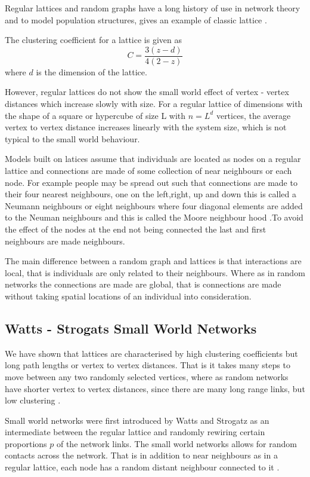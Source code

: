 Regular lattices and random graphs have a long history of use in network theory and to model population structures,  gives an example of classic lattice \citep{harris1974contact}.

The clustering coefficient for a lattice is given as  
\begin{equation}
C = \frac{3(z -d)}{4(2-z)}
\end{equation}
where $d$ is the dimension of the lattice.

However, regular lattices do not show the small world effect of vertex - vertex distances which increase slowly with size. For a regular lattice of dimensions with the shape of a square or hypercube of size L with $n = L^d$ vertices, the average vertex to vertex distance increases linearly with the system size, which is not typical to the small world behaviour. 


 Models built on latices assume that individuals are located as nodes on a regular lattice and connections are made of some collection of near neighbours or each node. For example people may be spread out such that connections are made to their four nearest neighbours, one on the left,right, up and down this is called a Neumann neighbours  or eight neighbours where four diagonal elements are added to the Neuman neighbours and this is called the Moore neighbour hood \citep{lloyd2006infection}.To avoid the effect of the nodes at the end not being connected the last and first neighbours are made neighbours.

The main difference between a random graph and lattices is that interactions are local, that is individuals are only related to their neighbours. Where as in random networks the connections are made are global, that is connections are made without taking spatial locations of an individual into consideration. 

\subsection{Watts - Strogats Small World Networks}
We have shown that lattices are characterised by high clustering coefficients but long path lengths or vertex to vertex distances. That is it takes many steps to move between any two randomly selected vertices, where as random networks have shorter vertex to vertex distances, since there are many long range links, but low clustering \citep{keeling2005networks}.


Small world networks  were first introduced by Watts and Strogatz as an intermediate between the regular lattice and randomly rewiring certain proportions $p$ of the network links\citep{watts1998collective}. The small world networks allows for random contacts across the network. That is in addition to near neighbours as in a regular lattice, each node has a random distant neighbour connected to it \citep{watts1998collective}.

